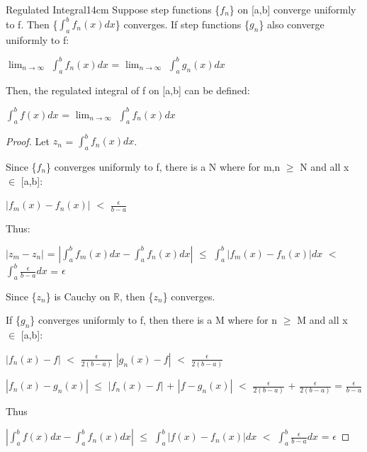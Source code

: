     \begin{wtheorem}{Regulated Integral}{14cm}
        Suppose step functions \{$f_n$\} on [a,b] converge uniformly to f.
        Then \{$\int_a^b f_n(x) dx$\} converges.
        If step functions \{$g_n$\} also converge uniformly to f:

        \hspace{0.5cm}
        $\lim_{n \rightarrow \infty}$ $\int_a^b f_n(x) dx$
        = $\lim_{n \rightarrow \infty}$ $\int_a^b g_n(x) dx$

        Then, the regulated integral of f on [a,b] can be defined:

        \hspace{0.5cm}
        $\int_a^b f(x) dx$
        = $\lim_{n \rightarrow \infty}$ $\int_a^b f_n(x) dx$
    \end{wtheorem}

    \begin{proof}
        Let $z_n$ = $\int_a^b f_n(x) dx$.
        
        Since \{$f_n$\} converges uniformly to f, there is a N where
        for m,n $\geq$ N and all x $\in$ [a,b]:

        \hspace{0.5cm}
        $|f_m(x) - f_n(x)|$ $<$ $\frac{\epsilon}{b-a}$

        Thus:

        \hspace{0.5cm}
        $|z_m - z_n|$
        = $|\int_a^b f_m(x) dx - \int_a^b f_n(x) dx|$
        $\leq$ $\int_a^b |f_m(x) - f_n(x)| dx$
        $<$ $\int_a^b \frac{\epsilon}{b-a} dx$
        = $\epsilon$

        Since \{$z_n$\} is Cauchy on $\mathbb{R}$, then 
        \{$z_n$\} converges.

        If \{$g_n$\} converges uniformly to f, then
        there is a M where for n $\geq$ M and all x $\in$ [a,b]:

        \hspace{0.5cm}
        $|f_n(x) - f|$ $<$ $\frac{\epsilon}{2(b-a)}$
        \hspace{1cm}
        $|g_n(x) - f|$ $<$ $\frac{\epsilon}{2(b-a)}$

        \hspace{0.5cm}
        $|f_n(x) - g_n(x)|$
        $\leq$ $|f_n(x) - f|$ + $|f - g_n(x)|$
        $<$ $\frac{\epsilon}{2(b-a)}$ + $\frac{\epsilon}{2(b-a)}$
        = $\frac{\epsilon}{b-a}$

        Thus
        
        \hspace{0.5cm}
        $|\int_a^b f(x) dx - \int_a^b f_n(x) dx|$
        $\leq$ $\int_a^b |f(x) - f_n(x)| dx$
        $<$ $\int_a^b \frac{\epsilon}{b-a} dx$
        = $\epsilon$
    \end{proof}

